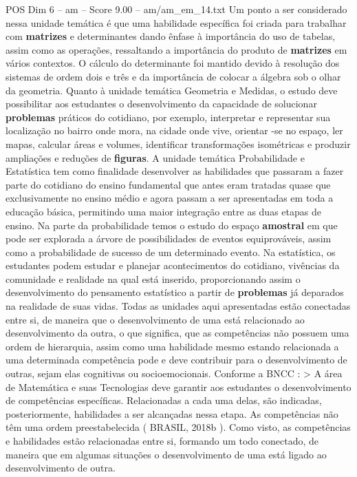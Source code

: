 \begin{textsample}{POS Dim 6 – am – Score 9.00 – am/am\_em\_14.txt}
Um ponto a ser considerado nessa unidade temática é que uma habilidade específica foi criada para trabalhar com \textbf{matrizes} e determinantes dando ênfase à importância do uso de tabelas, assim como as operações, ressaltando a importância do produto de \textbf{matrizes} em vários contextos.
O cálculo do determinante foi mantido devido à resolução dos sistemas de ordem dois e três e da importância de colocar a álgebra sob o olhar da geometria.
Quanto à unidade temática Geometria e Medidas, o estudo deve possibilitar aos estudantes o desenvolvimento da capacidade de solucionar \textbf{problemas} práticos do cotidiano, por exemplo, interpretar e representar sua localização no bairro onde mora, na cidade onde vive, orientar -se no espaço, ler mapas, calcular áreas e volumes, identificar transformações isométricas e produzir ampliações e reduções de \textbf{figuras}.
A unidade temática Probabilidade e Estatística tem como finalidade desenvolver as habilidades que passaram a fazer parte do cotidiano do ensino fundamental que antes eram tratadas quase que exclusivamente no ensino médio e agora passam a ser apresentadas em toda a educação básica, permitindo uma maior integração entre as duas etapas de ensino.
Na parte da probabilidade temos o estudo do espaço \textbf{amostral} em que pode ser explorada a árvore de possibilidades de eventos equiprováveis, assim como a probabilidade de sucesso de um determinado evento.
Na estatística, os estudantes podem estudar e planejar acontecimentos do cotidiano, vivências da comunidade e realidade na qual está inserido, proporcionando assim o desenvolvimento do pensamento estatístico a partir de \textbf{problemas} já deparados na realidade de suas vidas.
Todas as unidades aqui apresentadas estão conectadas entre si, de maneira que o desenvolvimento de uma está relacionado ao desenvolvimento da outra, o que significa, que as competências não possuem uma ordem de hierarquia, assim como uma habilidade mesmo estando relacionada a uma determinada competência pode e deve contribuir para o desenvolvimento de outras, sejam elas cognitivas ou socioemocionais.
Conforme a BNCC : > A área de Matemática e suas Tecnologias deve garantir aos estudantes o desenvolvimento de competências específicas.
Relacionadas a cada uma delas, são indicadas, posteriormente, habilidades a ser alcançadas nessa etapa.
As competências não têm uma ordem preestabelecida ( BRASIL, 2018b ).
Como visto, as competências e habilidades estão relacionadas entre si, formando um todo conectado, de maneira que em algumas situações o desenvolvimento de uma está ligado ao desenvolvimento de outra.

\end{textsample}
